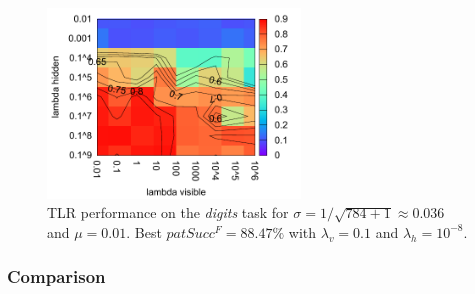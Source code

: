 
\begin{figure}[H]
  \centering
  \includegraphics[width=0.60\textwidth]{img/tlr-digits-psf.pdf} %
  \caption{TLR performance on the \emph{digits} task for $\sigma = 1/\sqrt{784+1} \approx 0.036$ and $\mu = 0.01$. Best $patSucc^F = 88.47\%$ with $\lambda_v=0.1$ and $\lambda_h=10^{-8}$.}
  \label{fig:results-tlr-digits-success}
\end{figure}



\subsubsection{Comparison} 
\label{sec:results-cmp-digits} 

